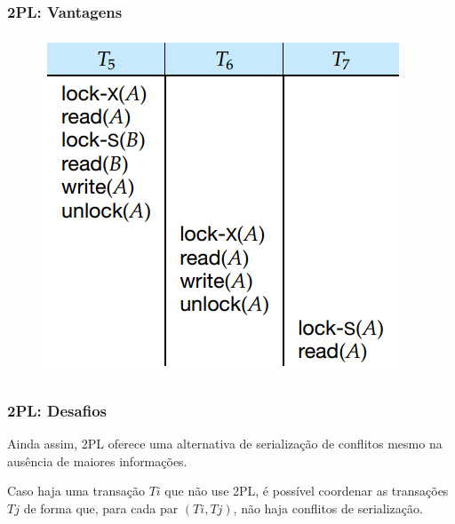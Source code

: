 \documentclass{beamer}
\begin{document}
\begin{frame} %
    \frametitle{2PL: Vantagens}

    \begin{figure}
        \includegraphics[width=0.6\linewidth]{example2.png}
    \end{figure}

\end{frame}







\begin{frame} %
    \frametitle{2PL: Desafios}

    Ainda assim, 2PL oferece uma alternativa de serialização de conflitos mesmo na ausência de maiores informações. 

    \medskip
    \begin{theorem}[Serialização do 2PL]
        Caso haja uma transação $Ti$ que não use 2PL, é possível coordenar as transações $Tj$ de forma que, para cada par $(Ti, Tj)$, não haja conflitos de serialização.
    \end{theorem}

    \medskip
\end{frame}
\end{document}
